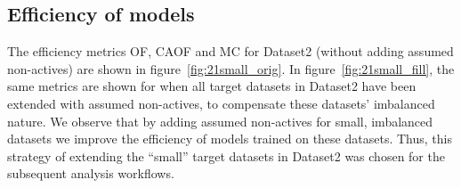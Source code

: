 \documentclass[utf8]{frontiersSCNS} %
\begin{document}
\subsection*{Efficiency of models}
The efficiency metrics OF, CAOF and MC for Dataset2 (without adding assumed
non-actives) are shown in figure~\ref{fig:21small_orig}. In
figure~\ref{fig:21small_fill}, the same metrics are shown for when all target
datasets in Dataset2 have been extended with assumed non-actives, to compensate
these datasets' imbalanced nature.
We observe that by adding assumed non-actives for small, imbalanced datasets we
improve the efficiency of models trained on these datasets. Thus, this strategy
of extending the ``small'' target datasets in Dataset2 was chosen for the
subsequent analysis workflows.
\end{document}
